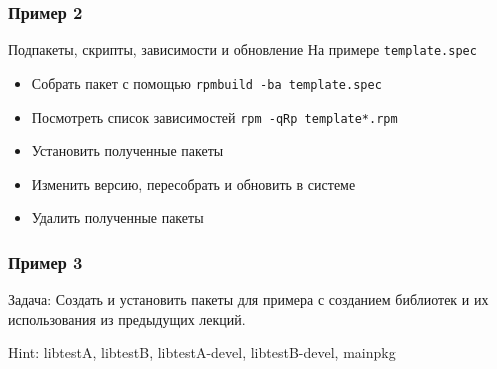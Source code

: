 \begin{frame}
	\frametitle{Пример 2}

	\begin{block}{Подпакеты, скрипты, зависимости и обновление}
		На примере {\tt template.spec}

		\begin{itemize}
			\item Собрать пакет с помощью {\tt rpmbuild -ba template.spec}
			\item Посмотреть список зависимостей {\tt rpm -qRp template*.rpm}
			\item Установить полученные пакеты
			\item Изменить версию, пересобрать и обновить в системе
			\item Удалить полученные пакеты
		\end{itemize}
	\end{block}
\end{frame}

\begin{frame}
	\frametitle{Пример 3}

	\begin{block}{Задача:}
		Создать и установить пакеты для примера с созданием библиотек
		и их использования из предыдущих лекций.
	\end{block}

	Hint: libtestA, libtestB, libtestA-devel, libtestB-devel, mainpkg

\end{frame}

